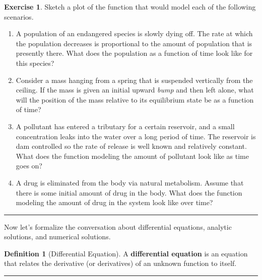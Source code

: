 \documentclass[
]{book}
\theoremstyle{definition}
\newtheorem{definition}{Definition}[chapter]
\theoremstyle{definition}
\theoremstyle{definition}
\newtheorem{exercise}{Exercise}[chapter]
\theoremstyle{remark}
\begin{document}
\begin{exercise}
\protect\hypertarget{exr:unnamed-chunk-409}{}{\label{exr:unnamed-chunk-409} }Sketch a plot of the function that would model each of the following
scenarios.

\begin{enumerate}
\def\labelenumi{\alph{enumi}.}
\item
  A population of an endangered species is slowly dying off. The rate
  at which the population decreases is proportional to the amount of
  population that is presently there. What does the population as a
  function of time look like for this species?
\item
  Consider a mass hanging from a spring that is suspended vertically from the ceiling. If the mass is given an initial upward \emph{bump} and then left alone, what will the position of the mass relative to its equilibrium state be as a function of time?
\item
  A pollutant has entered a tributary for a certain reservoir, and a
  small concentration leaks into the water over a long period of time.
  The reservoir is dam controlled so the rate of release is well known
  and relatively constant. What does the function modeling the amount
  of pollutant look like as time goes on?
\item
  A drug is eliminated from the body via natural metabolism. Assume
  that there is some initial amount of drug in the body. What does the
  function modeling the amount of drug in the system look like over
  time?
\end{enumerate}
\end{exercise}

\begin{center}\rule{0.5\linewidth}{0.5pt}\end{center}

Now let's formalize the conversation about differential equations, analytic solutions, and numerical solutions.

\begin{definition}[Differential Equation]
\protect\hypertarget{def:unnamed-chunk-410}{}{\label{def:unnamed-chunk-410} {} }A \textbf{differential equation} is an equation that relates the derivative
(or derivatives) of an unknown function to itself.
\end{definition}

\begin{center}\rule{0.5\linewidth}{0.5pt}\end{center}
\end{document}
